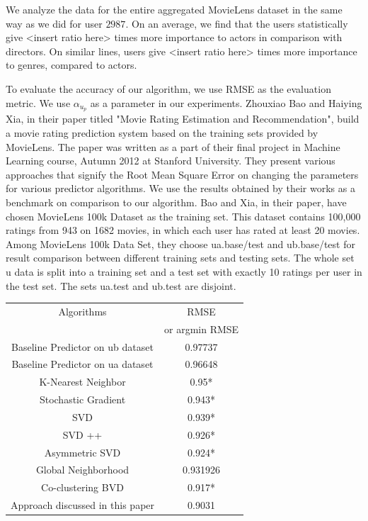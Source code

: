 \documentclass{acm_proc_article-sp}
\begin{document}
We analyze the data for the entire aggregated MovieLens dataset in the same way as we did for user $2987$. On an average, we find that the users statistically give <insert ratio here> times more importance to actors in comparison with directors. On similar lines, users give <insert ratio here> times more importance to genres, compared to actors.



To evaluate the accuracy of our algorithm, we use RMSE as the evaluation metric. We use $\alpha_{u_p}$ as a parameter in our experiments. Zhouxiao Bao and Haiying Xia, in their paper titled "Movie Rating Estimation and Recommendation", build a movie rating prediction system based on the training sets provided by MovieLens. The paper was written as a part of their final project in Machine Learning course, Autumn 2012 at Stanford University. They present various approaches that signify the Root Mean Square Error on changing the parameters for various predictor algorithms. We use the results obtained by their works as a benchmark on comparison to our algorithm. Bao and Xia, in their paper, have chosen MovieLens 100k Dataset as the training set. This dataset contains 100,000 ratings from 943 on 1682 movies, in which each user has rated at least 20 movies. Among MovieLens 100k Data Set, they choose ua.base/test and ub.base/test for result comparison between different training sets and testing sets. The whole set 
u data is split into a training set and a test set with exactly 10 ratings per user in the test set. The sets ua.test and ub.test are disjoint.
\begin{center}
  \begin{tabular}{| c | c |}
    \hline
    Algorithms & RMSE \\ 
    & or argmin RMSE \\ \hline \hline
    Baseline Predictor on ub dataset & 0.97737 \\ \hline
    Baseline Predictor on ua dataset & 0.96648 \\ \hline
    K-Nearest Neighbor & 0.95* \\ \hline
    Stochastic Gradient & 0.943* \\ \hline
    SVD & 0.939* \\ \hline
    SVD ++ & 0.926* \\ \hline
    Asymmetric SVD & 0.924* \\ \hline
    Global Neighborhood & 0.931926 \\ \hline
    Co-clustering BVD & 0.917* \\ \hline
    Approach discussed in this paper & 0.9031 \\ \hline
  \end{tabular}
\end{center}
\end{document}
